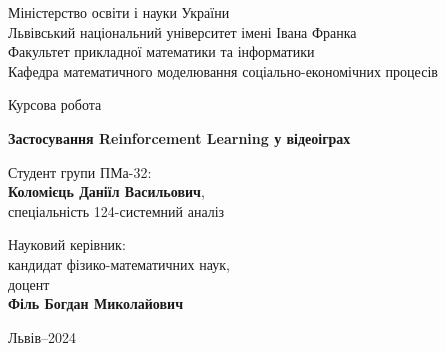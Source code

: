 \thispagestyle{empty}
\renewcommand{\baselinestretch}{1}

\Large
\begin{center}
Міністерство освіти і науки України \\
Львівський національний університет імені Івана Франка \\
Факультет прикладної математики та інформатики \\
Кафедра математичного моделювання соціально-економічних процесів
\end{center}

\vspace*{2cm}
\begin{center}
\huge Курсова робота
\end{center}

\vspace*{1cm}
\large
\begin{center}
\textbf{Застосування Reinforcement Learning у відеоіграх} \\
\end{center}
\vspace*{1cm}
\normalsize

\vspace*{2cm}
\noindent
\hspace*{6.6cm}Студент групи ПМа-32: \\
\hspace*{6.6cm}\textbf{Коломієць Даніїл Васильович}, \\
\hspace*{6.6cm}спеціальність 124-системний аналіз

\vspace*{0.5cm}
\noindent
\hspace*{6.6cm}Науковий керівник: \\
\hspace*{6.6cm}кандидат фізико-математичних наук, \\
\hspace*{6.6cm}доцент \\
\hspace*{6.6cm}\textbf{Філь Богдан Миколайович}

\vspace*{0.5cm}
\noindent

\vspace*{2cm}
\large
\begin{center}
Львів--2024
\end{center}
\normalsize
\renewcommand{\baselinestretch}{1.3}
\tableofcontents